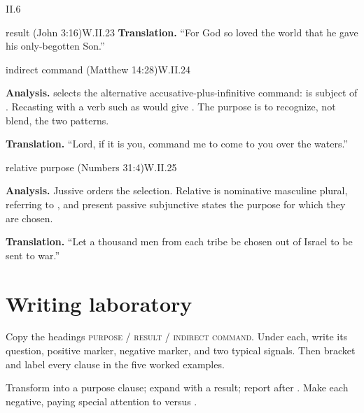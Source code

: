 \begin{courseunit}{II.6}
\begin{workedexample}{result (John 3:16)}{W.II.23}
\textbf{Translation.}  ``For God so loved the world that he gave his only-begotten Son.''
\end{workedexample}

\begin{workedexample}{indirect command (Matthew 14:28)}{W.II.24}

\textbf{Analysis.}   selects the alternative accusative-plus-infinitive command:
 is subject of .  Recasting with a verb such as 
would give .  The purpose is to recognize, not blend, the two
patterns.

\textbf{Translation.}  ``Lord, if it is you, command me to come to you over the waters.''
\end{workedexample}

\begin{workedexample}{relative purpose (Numbers 31:4)}{W.II.25}

\textbf{Analysis.}  Jussive  orders the selection.  Relative  is
nominative masculine plural, referring to , and present passive subjunctive
 states the purpose for which they are chosen.

\textbf{Translation.}  ``Let a thousand men from each tribe be chosen out of Israel to be sent
to war.''
\end{workedexample}

\section{Writing laboratory}

Copy the headings \textsc{purpose / result / indirect command}.  Under each, write its
question, positive marker, negative marker, and two typical signals.  Then bracket and label
every clause in the five worked examples.

Transform  into a purpose clause; expand
 with a result; report  after .  Make each negative, paying special attention to  versus
.



\end{courseunit}

